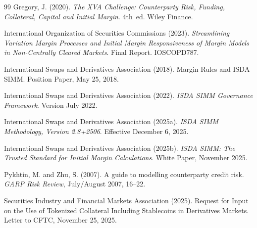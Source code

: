 \documentclass[12pt,letterpaper]{article}
\numberwithin{equation}{section}
\theoremstyle{remark}
\begin{document}
\begin{thebibliography}{99}
Gregory, J. (2020).
\newblock \emph{The XVA Challenge: Counterparty Risk, Funding, Collateral,
  Capital and Initial Margin}. 4th~ed.
\newblock Wiley Finance.

International Organization of Securities Commissions (2023).
\newblock \emph{Streamlining Variation Margin Processes and Initial Margin
  Responsiveness of Margin Models in Non-Centrally Cleared Markets}.
\newblock Final Report. IOSCOPD787.

International Swaps and Derivatives Association (2018).
\newblock Margin Rules and ISDA SIMM.
\newblock Position Paper, May 25, 2018.

International Swaps and Derivatives Association (2022).
\newblock \emph{ISDA SIMM Governance Framework}.
\newblock Version July 2022.

International Swaps and Derivatives Association (2025a).
\newblock \emph{ISDA SIMM Methodology, Version 2.8+2506}.
\newblock Effective December 6, 2025.

International Swaps and Derivatives Association (2025b).
\newblock \emph{ISDA SIMM: The Trusted Standard for Initial Margin
  Calculations}.
\newblock White Paper, November 2025.

Pykhtin, M. and Zhu, S. (2007).
\newblock A guide to modelling counterparty credit risk.
\newblock \emph{GARP Risk Review}, July/August 2007, 16--22.

Securities Industry and Financial Markets Association (2025).
\newblock Request for Input on the Use of Tokenized Collateral Including
  Stablecoins in Derivatives Markets.
\newblock Letter to CFTC, November 25, 2025.

\end{thebibliography}
\end{document}

